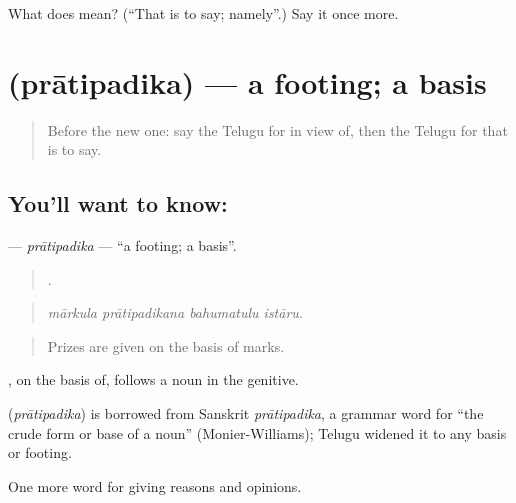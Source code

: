 \begin{tcolorbox}[breakable,colback=teal!4,colframe=teal!35!black,title={Before you move on}]
What does  mean? (\textquotedblleft{}That is to say; namely\textquotedblright{}.) Say it once more.
\end{tcolorbox}
\section[\texorpdfstring{\te{ప్రాతిపదిక} (prātipadika)}{ప్రాతిపదిక (prātipadika)}]{ (prātipadika) — a footing; a basis}

\label{lesson:TE-C395-pratipadika}



\begin{quote}
Before the new one: say the Telugu for in view of, then the Telugu for that is to say.
\end{quote}

\subsection*{You'll want to know: }
\textbf{} — \emph{prātipadika} — \textquotedblleft{}a footing; a basis\textquotedblright{}.

\begin{quote}
   .
\end{quote}

\begin{quote}
\emph{mārkula prātipadikana bahumatulu istāru.}
\end{quote}

\begin{quote}
Prizes are given on the basis of marks.
\end{quote}

, on the basis of, follows a noun in the genitive.

\begin{cousinweb}
\textbf{} (\emph{prātipadika}) is borrowed from Sanskrit \emph{prātipadika}, a grammar word for \textquotedblleft{}the crude form or base of a noun\textquotedblright{} (Monier-Williams); Telugu widened it to any basis or footing.
\end{cousinweb}

\begin{grammarlens}[title={What you've built}]
One more word for giving reasons and opinions.
\end{grammarlens}

